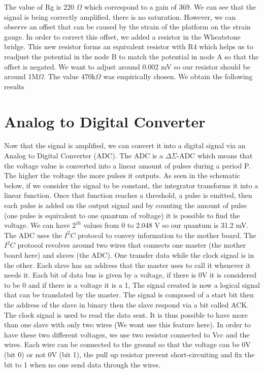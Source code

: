 \documentclass{article}[12pt]
\begin{document}
The value of Rg is 220 $\Omega$ which correspond to a gain of 369.
We can see that the signal is being correctly amplified, there is no saturation. However, we can observe an offset that can be caused by the strain of the platform on the strain gauge.
In order to correct this offset, we added a resistor in the Wheatstone bridge.
This new resistor forms an equivalent resistor with R4 which helps us to readjust the potential in the node B to match the potential in node A so that the offset is negated.
We want to adjust around 0.002 mV so our resistor should be around 1M$\Omega$.
The value 470k$\Omega$ was empirically chosen.
We obtain the following results

\section{Analog to Digital Converter}
Now that the signal is amplified, we can convert it into a digital signal via an Analog to Digital Converter (ADC).
The ADC is a $\Delta$$\Sigma$-ADC which means that the voltage value is converted into a linear amount of pulses during a period P. 
The higher the voltage the more pulses it outputs.
As seen in the schematic below, if we consider the signal to be constant, the integrator transforms it into a linear function.
Once that function reaches a threshold, a pulse is emitted, then each pulse is added on the output signal and by counting the amount of pulse (one pulse is equivalent to one quantum of voltage) it is possible to find the voltage.
We can have $2^16$ values from 0 to 2.048 V so our quantum is 31.2 mV.
The ADC uses the $I^2C$ protocol to convey information to the mother board. 
The $I^2C$ protocol revolves around two wires that connects one master (the mother board here) and slaves (the ADC). 
One transfer data while the clock signal is in the other.
Each slave has an address that the master uses to call it whenever it needs it.
Each bit of data bus is given by a voltage, if there is 0V it is considered to be 0 and if there is a voltage it is a 1,
The signal created is now a logical signal that can be translated by the master.
The signal is composed of a start bit then the address of the slave in binary then the slave respond via a bit called ACK.
The clock signal is used to read the data sent.
It is thus possible to have more than one slave with only two wires (We wont use this feature here).
In order to have these two different voltages, we use two resistor connected to Vcc and the wires.
Each wire can be connected to the ground so that the voltage can be 0V (bit 0) or not 0V (bit 1), the pull up resistor prevent short-circuiting and fix the bit to 1 when no one send data through the wires.
\end{document}
